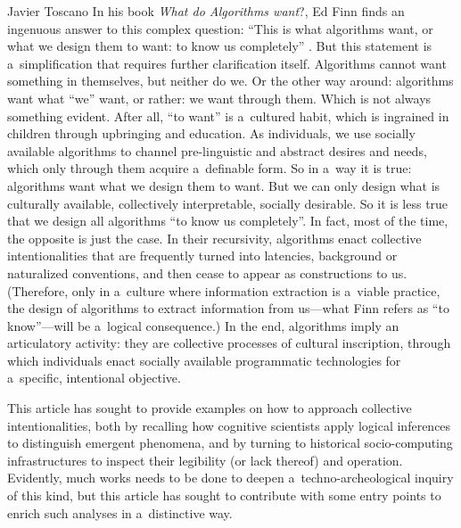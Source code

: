 \begin{artengenv}{Javier Toscano}
In his book \textit{What do Algorithms want}?, Ed Finn finds an ingenuous answer to this complex question: ``This is what algorithms want, or what we design them to want: to know us completely''
\parencite[][p.82]{finn_what_2017}. %
 But this statement is a~simplification that requires further clarification itself. Algorithms cannot want something in themselves, but neither do we. Or the other way around: algorithms want what ``we'' want, or rather: we want through them. Which is not always something evident. After all, ``to want'' is a~cultured habit, which is ingrained in children through upbringing and education. As individuals, we use socially available algorithms to channel pre-linguistic and abstract desires and needs, which only through them acquire a~definable form. So in a~way it is true: algorithms want what we design them to want. But we can only design what is culturally available, collectively interpretable, socially desirable. So it is less true that we design all algorithms ``to know us completely''. In fact, most of the time, the opposite is just the case. In their recursivity, algorithms enact collective intentionalities that are frequently turned into latencies, background or naturalized conventions, and then cease to appear as constructions to us. (Therefore, only in a~culture where information extraction is a~viable practice, the design of algorithms to extract information from us---what Finn refers as ``to know''---will be a~logical consequence.) In the end, algorithms imply an articulatory activity: they are collective processes of cultural inscription, through which individuals enact socially available programmatic technologies for a~specific, intentional objective.

This article has sought to provide examples on how to approach collective intentionalities, both by recalling how cognitive scientists apply logical inferences to distinguish emergent phenomena, and by turning to historical socio-computing infrastructures to inspect their legibility (or lack thereof) and operation. Evidently, much works needs to be done to deepen a~techno-archeological inquiry of this kind, but this article has sought to contribute with some entry points to enrich such analyses in a~distinctive way.



\end{artengenv}

